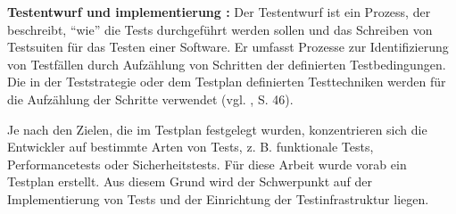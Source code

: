 \textbf{Testentwurf und implementierung :} Der Testentwurf ist ein Prozess,
der beschreibt, ``wie'' die Tests durchgef\"uhrt werden sollen und das
Schreiben von Testsuiten f\"ur das Testen einer Software. Er umfasst Prozesse
zur Identifizierung von Testf\"allen durch Aufz\"ahlung von Schritten der
definierten Testbedingungen. Die in der Teststrategie oder dem Testplan
definierten Testtechniken werden f\"ur die Aufz\"ahlung
der Schritte verwendet (vgl. \cite{shultz2011software}, S. 46).



Je nach den Zielen, die im Testplan festgelegt wurden, konzentrieren sich die
Entwickler auf bestimmte Arten von Tests, z. B. funktionale Tests,
Performancetests oder Sicherheitstests. F\"ur diese Arbeit wurde vorab ein
Testplan erstellt. Aus diesem Grund wird der Schwerpunkt auf der Implementierung
von Tests und der Einrichtung der Testinfrastruktur liegen.

